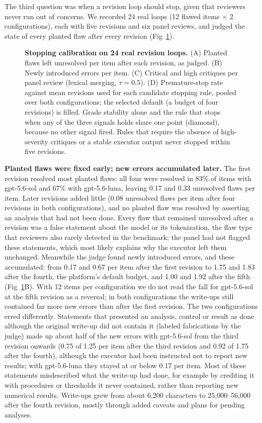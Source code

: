 \documentclass[10pt,letterpaper]{article}
\begin{document}
The third question was when a revision loop should stop, given that reviewers never run out of concerns. We recorded 24 real loops (12 flawed items $\times$ 2 configurations), each with five revisions and six panel reviews, and judged the state of every planted flaw after every revision (Fig~\ref{fig4}).

\begin{figure}[!h]
\caption{{\bf Stopping calibration on 24 real revision loops.}
(A) Planted flaws left unresolved per item after each revision, as judged. (B) Newly introduced errors per item. (C) Critical and high critiques per panel review (lexical merging, $\tau=0.5$). (D) Premature-stop rate against mean revisions used for each candidate stopping rule, pooled over both configurations; the selected default (a budget of four revisions) is filled. Grade stability alone and the rule that stops when any of the three signals holds share one point (diamond), because no other signal fired. Rules that require the absence of high-severity critiques or a stable executor output never stopped within five revisions.}
\label{fig4}
\end{figure}

\textbf{Planted flaws were fixed early; new errors accumulated later.} The first revision resolved most planted flaws: all four were resolved in 83\% of items with gpt-5.6-sol and 67\% with gpt-5.6-luna, leaving 0.17 and 0.33 unresolved flaws per item. Later revisions added little (0.08 unresolved flaws per item after four revisions in both configurations), and no planted flaw was resolved by asserting an analysis that had not been done. Every flaw that remained unresolved after a revision was a false statement about the model or its tokenization, the flaw type that reviewers also rarely detected in the benchmark; the panel had not flagged these statements, which most likely explains why the executor left them unchanged. Meanwhile the judge found newly introduced errors, and these accumulated: from 0.17 and 0.67 per item after the first revision to 1.75 and 1.83 after the fourth, the platform's default budget, and 1.00 and 1.92 after the fifth (Fig~\ref{fig4}B). With 12 items per configuration we do not read the fall for gpt-5.6-sol at the fifth revision as a reversal; in both configurations the write-ups still contained far more new errors than after the first revision. The two configurations erred differently. Statements that presented an analysis, control or result as done although the original write-up did not contain it (labeled fabrications by the judge) made up about half of the new errors with gpt-5.6-sol from the third revision onwards (0.75 of 1.25 per item after the third revision and 0.92 of 1.75 after the fourth), although the executor had been instructed not to report new results; with gpt-5.6-luna they stayed at or below 0.17 per item. Most of these statements misdescribed what the write-up had done, for example by crediting it with procedures or thresholds it never contained, rather than reporting new numerical results. Write-ups grew from about 6,200 characters to 25,000--56,000 after the fourth revision, mostly through added caveats and plans for pending analyses.
\end{document}

